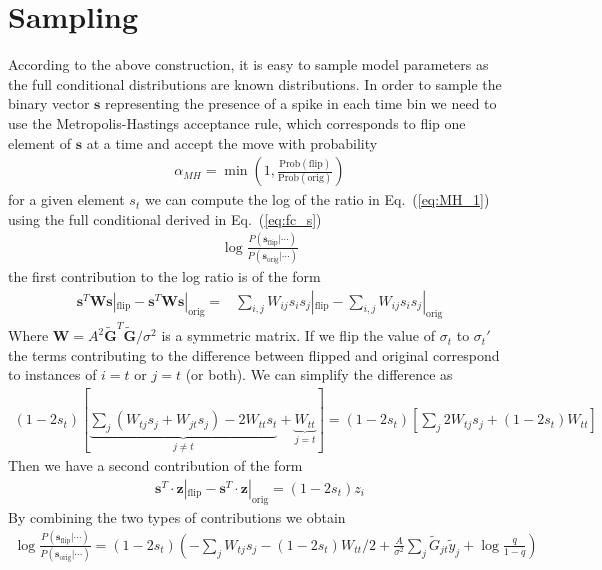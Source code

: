 \documentclass{article}
\theoremstyle{remark}
\begin{document}
\section{Sampling}
According to the above construction, it is easy to sample model parameters as the full conditional distributions are known distributions. In order to sample the binary vector $\bm s$ representing the presence of a spike in each time bin we need to use the Metropolis-Hastings acceptance rule, which corresponds to flip one element of $\bm s$ at a time and accept the move with probability
\begin{align}
    \alpha_{MH} =\min\left(1,\frac{\mathrm{Prob(flip)}}{\mathrm{Prob(orig)}}\right)\label{eq:MH_1}
\end{align}
for a given element $s_t$ we can compute the log of the ratio in Eq.~(\ref{eq:MH_1}) using the full conditional derived in Eq.~(\ref{eq:fc_s})
\begin{align}
    \log\frac{P(\bm{s}_\mathrm{flip}|\cdots)}{P(\bm{s}_\mathrm{orig}|\cdots)}
\end{align}
the first contribution to the log ratio is of the form
\begin{align}
    \bm s^T \bm{W} \bm{s}|_\mathrm{flip} - \bm s^T \bm{W} \bm{s}|_\mathrm{orig} =& \sum_{i,j} W_{ij}s_i s_j|_\mathrm{flip} - \sum_{i,j} W_{ij}s_i s_j|_\mathrm{orig}
\end{align}
Where $\bm W=A^2\bm{\tilde G}^T\bm{\tilde G}/\sigma^2$ is a symmetric matrix. If we flip the value of $\sigma_t$ to $\sigma_t'$ the terms contributing to the difference between flipped and original correspond to instances of $i=t$ or $j=t$ (or both). We can simplify the difference as
\begin{align}
    (1-2s_t)\left[\underbrace{\sum_{j} (W_{tj} s_j +W_{jt} s_j) - 2W_{tt}s_t}_{j\neq t}+\underbrace{W_{tt}}_{j=t}\right]= (1-2s_t)\left[\sum_{j} 2W_{tj} s_j  + (1-2s_t) W_{tt}\right]
\end{align}
Then we have a second contribution of the form 
\begin{align}
    \bm{s}^T\cdot \bm z|_\mathrm{flip}-\bm{s}^T\cdot \bm z|_\mathrm{orig}= (1-2s_t) z_i
\end{align}
By combining the two types of contributions we obtain
\begin{align}
    \log\frac{P(\bm{s}_\mathrm{flip}|\cdots)}{P(\bm{s}_\mathrm{orig}|\cdots)}=(1-2s_t)\left(-\sum_j W_{tj}s_j - (1-2s_t)W_{tt}/2 + \frac{A}{\sigma^2}\sum_j \tilde G_{jt}\tilde y_j + \log\frac{q}{1-q}\right)
\end{align}
\end{document}
